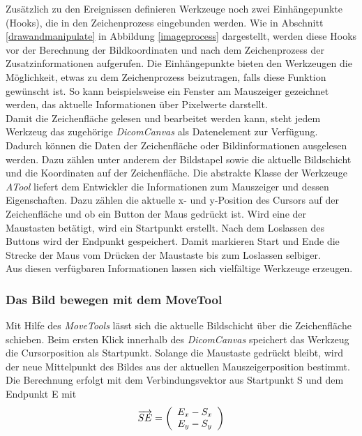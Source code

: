Zusätzlich zu den Ereignissen definieren Werkzeuge noch zwei Einhängepunkte (Hooks), die in den Zeichenprozess eingebunden werden. Wie in Abschnitt \ref{drawandmanipulate} in Abbildung \ref{imageprocess} dargestellt, werden diese Hooks vor der Berechnung der Bildkoordinaten und nach dem Zeichenprozess der Zusatzinformationen aufgerufen. Die Einhängepunkte bieten den Werkzeugen die Möglichkeit, etwas zu dem Zeichenprozess beizutragen, falls diese Funktion gewünscht ist. So kann beispielsweise ein Fenster am Mauszeiger gezeichnet werden, das aktuelle Informationen über Pixelwerte darstellt.\\
Damit die Zeichenfläche gelesen und bearbeitet werden kann, steht jedem Werkzeug das zugehörige \textit{DicomCanvas} als Datenelement zur Verfügung. Dadurch können die Daten der Zeichenfläche oder Bildinformationen ausgelesen werden. Dazu zählen unter anderem der Bildstapel sowie die aktuelle Bildschicht und die Koordinaten auf der Zeichenfläche. Die abstrakte Klasse der Werkzeuge \textit{ATool} liefert dem Entwickler die Informationen zum Mauszeiger und dessen Eigenschaften. Dazu zählen die aktuelle x- und y-Position des Cursors auf der Zeichenfläche und ob ein Button der Maus gedrückt ist. Wird eine der Maustasten betätigt, wird ein Startpunkt erstellt. Nach dem Loslassen des Buttons wird der Endpunkt gespeichert.
Damit markieren Start und Ende die Strecke der Maus vom Drücken der Maustaste bis zum Loslassen selbiger.\\
Aus diesen verfügbaren Informationen lassen sich vielfältige Werkzeuge erzeugen. 

\FloatBarrier
\subsubsection{Das Bild bewegen mit dem MoveTool}
Mit Hilfe des \textit{MoveTools} lässt sich die aktuelle Bildschicht über die Zeichenfläche schieben. Beim ersten Klick innerhalb des \textit{DicomCanvas} speichert das Werkzeug die Cursorposition als Startpunkt. Solange die Maustaste gedrückt bleibt, wird der neue Mittelpunkt des Bildes aus der aktuellen Mauszeigerposition bestimmt. Die Berechnung erfolgt mit dem Verbindungsvektor aus Startpunkt S und dem Endpunkt E mit 
\begin{equation}
\overrightarrow{SE}=\left(\begin{array}{c} E_x - S_x \\ E_y  - S_y\\ \end{array}\right)
\vspace{0.5cm}
\end{equation}


